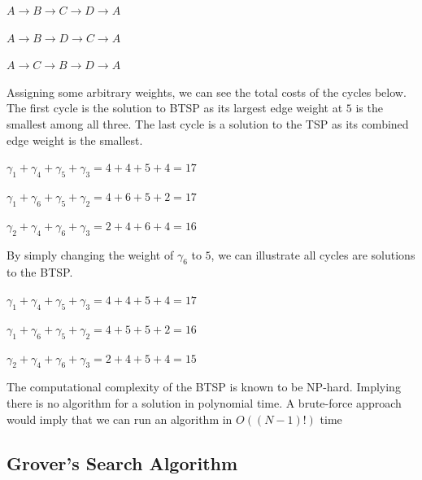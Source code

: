 \documentclass[twocolumn,showpacs,preprintnumbers,amsmath,amssymb]{revtex4}
\begin{document}
		\begin{center}
		$ A \rightarrow B \rightarrow C \rightarrow D \rightarrow A $
		
		$ A \rightarrow B \rightarrow D \rightarrow C \rightarrow A $ 
		
		$ A \rightarrow C \rightarrow B \rightarrow D \rightarrow A $
	    \end{center}
		
		Assigning some arbitrary weights, we can see the total costs of the cycles below. The first cycle is the solution to BTSP as its largest edge weight at $5$ is the smallest among all three. The last cycle is a solution to the TSP as its combined edge weight is the smallest.
		\begin{center}
		$\gamma_1 + \gamma_4 + \gamma_5 + \gamma_3 = 4 + 4 + 5 + 4 = 17$
		
		$ \gamma_1 + \gamma_6 + \gamma_5 + \gamma_2 = 4 + 6 + 5 + 2 = 17$
		
		$  \gamma_2 + \gamma_4 + \gamma_6 + \gamma_3 = 2 + 4 + 6 + 4 = 16$
		\end{center}
		

		By simply changing the weight of $\gamma_6$ to $5$, we can illustrate all cycles are solutions to the BTSP. 
		
		\begin{center}

			$\gamma_1 + \gamma_4 + \gamma_5 + \gamma_3 = 4 + 4 + 5 + 4 = 17$
			
			$ \gamma_1 + \gamma_6 + \gamma_5 + \gamma_2 = 4 + 5 + 5 + 2 = 16$
			
			$  \gamma_2 + \gamma_4 + \gamma_6 + \gamma_3 = 2 + 4 + 5 + 4 = 15$
		\end{center}
		
		The computational complexity of the BTSP is known to be NP-hard. Implying there is no algorithm for a solution in polynomial time. A brute-force approach would imply that we can run an algorithm in $O((N-1)!)$ time
		\subsection{Grover's Search Algorithm}
		
\end{document}
